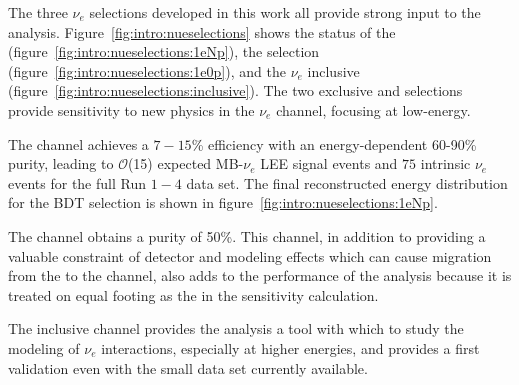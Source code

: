 \par The three $\nu_e$ selections developed in this work all provide strong input to the analysis. Figure~\ref{fig:intro:nueselections} shows the status of the \npsel (figure~\ref{fig:intro:nueselections:1eNp}), the \zpsel selection (figure~\ref{fig:intro:nueselections:1e0p}), and the $\nu_e$ inclusive (figure~\ref{fig:intro:nueselections:inclusive}). The two exclusive \npsel and \zpsel selections provide sensitivity to new physics in the $\nu_e$ channel, focusing at low-energy. 
\par The \npsel channel achieves a $7-15$\% efficiency with an energy-dependent 60-90\%  purity, leading to $\mathcal{O}$(15) expected MB-$\nu_e$ LEE signal events and $75$ intrinsic $\nu_e$ events for the full Run $1-4$ data set. The final reconstructed energy distribution for the BDT selection is shown in figure~\ref{fig:intro:nueselections:1eNp}.  
\par The \zpsel channel obtains a purity of 50\%. This channel, in addition to providing a valuable constraint of detector and modeling effects which can cause migration from the \npsel to the \zpsel channel, also adds to the performance of the analysis because it is treated on equal footing as the \npsel in the sensitivity calculation.
\par The inclusive channel provides the analysis a tool with which to study the modeling of $\nu_e$ interactions, especially at higher energies, and provides a first validation even with the small data set currently available.


